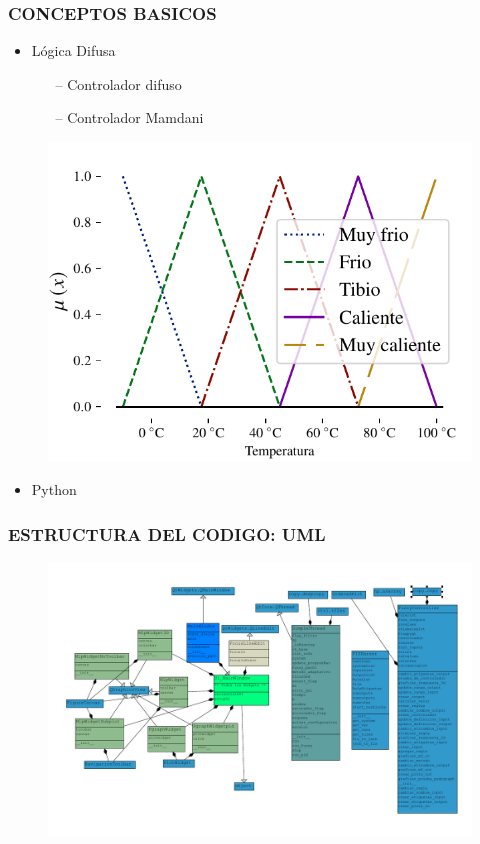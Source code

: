 \documentclass[usenames,xcolor={dvipsnames, table}]{beamer}
\begin{document}
\begin{frame}
	\frametitle{CONCEPTOS BASICOS}
	\vspace{25pt}

	\begin{itemize}
		\Large
		\setlength\itemsep{1em}
		\item Lógica Difusa
		\begin{itemize}
			\large
			\setlength\itemsep{1em}
			\vspace{1em}
			\item[--] Controlador difuso
			\item[--] Controlador Mamdani 
		\end{itemize}
	\end{itemize}

	\begin{figure}
		\includegraphics[width=0.5\linewidth]{imagenes/FuzzySet.pdf}
	\end{figure}
	\vspace{-20pt}
	\begin{itemize}
		\Large
		\item Python
	\end{itemize}

\end{frame}

\begin{frame}
	\frametitle{ESTRUCTURA DEL CODIGO: UML}
	\vspace{20pt}
	\begin{figure}
		\includegraphics[width=\linewidth]{imagenes/UMLsinHandlers.pdf}
	\end{figure}
\end{frame}
\end{document}

